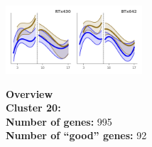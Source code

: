 \begin{multicols}{2}
\includegraphics[width=2in]{figures/clusters/leaf_Preflowering_19.png}
\columnbreak

\noindent \textbf{Overview}\\\textbf{Cluster 20:}  \\
\textbf{Number of genes:} 995 \\
\textbf{Number of ``good'' genes:} 92 \\
\end{multicols}

